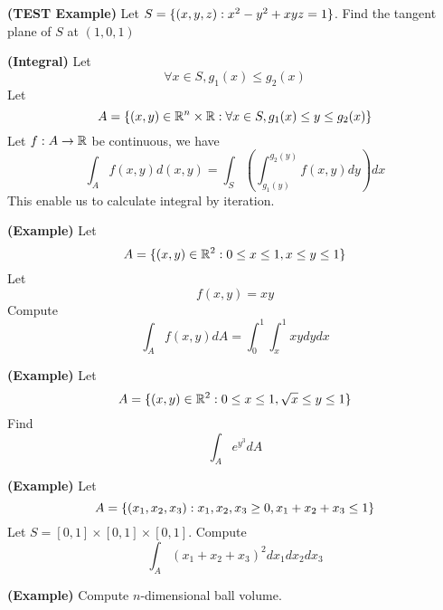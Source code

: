 \documentclass{report}
\begin{document}
\begin{theorem}
\label{4.2.19}
\textbf{(TEST Example)} Let $S=\{ (x,y,z):x^2-y^2+xyz=1 \}$. Find the tangent plane of $S$ at $(1,0,1)$ 
\end{theorem}
\begin{theorem}
\label{4.2.20}
\textbf{(Integral)} Let 
 \begin{equation}
\forall x \in S, g_1(x)\leq g_2(x)
\end{equation}
Let  
\begin{equation}
A=\{ (x,y)\in \mathbb{R}^n \times \mathbb{R}: \forall x \in S, g_1(x)\leq y\leq g_2(x) \}
\end{equation}
Let $f:A \rightarrow \mathbb{R}$ be continuous, we have
\begin{equation}
\int_A f(x,y)d(x,y)=\int_S(\int_{g_1(y)}^{g_2(y)} f(x,y)dy)dx
\end{equation}
This enable us to calculate integral by iteration.  
\end{theorem}
\begin{theorem}
\label{4.2.21}
\textbf{(Example)} Let 
\begin{equation}
A=\{ (x,y)\in\mathbb{R}^2 : 0\leq x\leq 1, x\leq y\leq 1 \}
\end{equation}
Let 
\begin{equation}
f(x,y)=xy
\end{equation}
Compute
\begin{equation}
\int_A f(x,y)dA=\int^1_0 \int^1_x xy dydx
\end{equation}
\end{theorem}
\begin{theorem}
\label{4.2.22}
\textbf{(Example)} Let 
\begin{equation}
A=\{ (x,y)\in\mathbb{R}^2 :0\leq x\leq 1, \sqrt{x} \leq y\leq 1 \}
\end{equation}
Find 
\begin{equation}
\int_A e^{y^3}dA
\end{equation}
\end{theorem}
\begin{theorem}
\label{4.2.23}
\textbf{(Example)} Let 
\begin{equation}
A=\{ (x_1,x_2,x_3):x_1,x_2,x_3 \geq 0, x_1+x_2+x_3\leq 1 \}
\end{equation}
Let $S=[0,1]\times [0,1]\times [0,1]$. Compute
\begin{equation}
\int_A (x_1+x_2+x_3)^2 dx_1dx_2dx_3
\end{equation}
\end{theorem}
\begin{theorem}
\label{4.2.24}
\textbf{(Example)} Compute $n$-dimensional ball volume.
\end{theorem}
\end{document}
